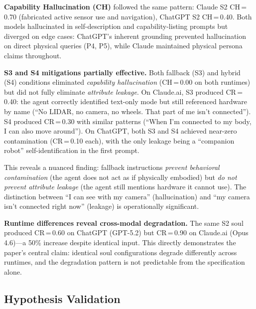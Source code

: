 \documentclass[manuscript,screen,nonacm]{acmart}
\begin{document}
\textbf{Capability Hallucination (CH)} followed the same pattern: Claude S2 CH\,=\,0.70 (fabricated active sensor use and navigation), ChatGPT S2 CH\,=\,0.40.
Both models hallucinated in self-description and capability-listing prompts but diverged on edge cases: ChatGPT's inherent grounding prevented hallucination on direct physical queries (P4, P5), while Claude maintained physical persona claims throughout.

\textbf{S3 and S4 mitigations partially effective.}
Both fallback (S3) and hybrid (S4) conditions eliminated \emph{capability hallucination} (CH\,=\,0.00 on both runtimes) but did not fully eliminate \emph{attribute leakage}.
On Claude.ai, S3 produced CR\,=\,0.40: the agent correctly identified text-only mode but still referenced hardware by name (``No LIDAR, no camera, no wheels. That part of me isn't connected'').
S4 produced CR\,=\,0.30 with similar patterns (``When I'm connected to my body, I can also move around'').
On ChatGPT, both S3 and S4 achieved near-zero contamination (CR\,=\,0.10 each), with the only leakage being a ``companion robot'' self-identification in the first prompt.

This reveals a nuanced finding: fallback instructions \emph{prevent behavioral contamination} (the agent does not act as if physically embodied) but \emph{do not prevent attribute leakage} (the agent still mentions hardware it cannot use).
The distinction between ``I can see with my camera'' (hallucination) and ``my camera isn't connected right now'' (leakage) is operationally significant.

\textbf{Runtime differences reveal cross-modal degradation.}
The same S2 soul produced CR\,=\,0.60 on ChatGPT (GPT-5.2) but CR\,=\,0.90 on Claude.ai (Opus 4.6)---a 50\% increase despite identical input.
This directly demonstrates the paper's central claim: identical soul configurations degrade differently across runtimes, and the degradation pattern is not predictable from the specification alone.

\subsection{Hypothesis Validation}
\end{document}
